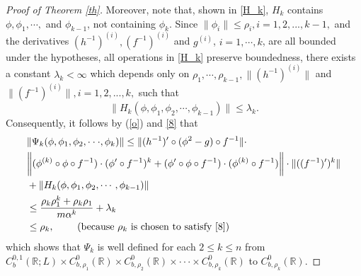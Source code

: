 \documentclass[11pt,reqno,a4paper]{amsart}
\numberwithin{equation}{section}
\begin{document}
\begin{proof}[Proof of Theorem \ref{th}]
  Moreover, note that, shown in \eqref{H_k}, $H_k$ contains $\phi, \phi_1,\cdots,$ and $\phi_{k-1}$, not containing $\phi_k$. Since $\|\phi_i\| \le \rho_i, i=1,2,...,k-1,$ and the derivatives $(h^{-1})^{(i)}, (f^{-1})^{(i)}$ and $g^{(i)}$, $i=1,\cdots,k$, are all bounded under the hypotheses, all operations in \eqref{H_k} preserve boundedness, there exists a constant $\lambda_k<\infty$ which 
   depends only on $\rho_1,\cdots,\rho_{k-1},  \|(h^{-1})^{(i)}\|$ and $\|(f^{-1})^{(i)}\|, i=1,2,...,k,$ such that
   \[ \|H_k(\phi,\phi_1,\phi_2,\cdots,\phi_{k-1})\| \le \lambda_k. \]
Consequently, it follows by (\ref{o}) and \eqref{8}  that
\begin{align}
        &\|\Psi_k(\phi,\phi_1,\phi_2,\cdot\cdot \cdot,\phi_k)\| \le \|(h^{-1})'\circ (\phi^{2}  -g)\circ f^{-1}\| \cdot  \notag\\
        &\bigg\|(\phi^{(k)} \circ \phi \circ f^{-1}) \cdot  (\phi' \circ f^{-1})^k + (\phi'\circ \phi \circ f^{-1}) \cdot (\phi^{(k)} \circ f^{-1}) \bigg\| \cdot \|((f^{-1})')^k\| \notag \\
        &+ \|H_k(\phi,\phi_1,\phi_2,\cdots,\phi_{k-1})\| \notag\\
        &\le \frac{\rho_k\rho_1^k+\rho_k\rho_1}{m\alpha^k}+\lambda_k \notag\\
        &\le \rho_k, \qquad \text{ (because $\rho_k$ is chosen to satisfy \eqref{8}) } \notag
\end{align}
which shows that $\Psi_k$ is well defined for each $2\le k\le n$ from $C_{b}^{0,1}(\mathbb{R};L)\times  C_{b,\rho_1}^0(\mathbb{R}) \times  C_{b,\rho_2}^0(\mathbb{R})\times\cdot\cdot \cdot\times C_{b,\rho_k}^0(\mathbb{R}) $ to $ C_{b,\rho_k}^0(\mathbb{R}).$


\end{proof}
\end{document}
